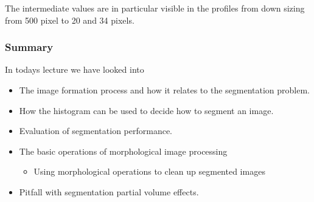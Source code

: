 \documentclass[letterpaper,10pt,english]{sphinxmanual}
\begin{document}
\begin{sphinxVerbatim}[commandchars=\\\{\}]
    \PYG{p}{[}\PYG{p}{[}\PYG{p}{]}\PYG{p}{]}  
\end{sphinxVerbatim}

\noindent{}

\sphinxAtStartPar
The intermediate values are in particular visible in the profiles from down sizing from 500 pixel to 20 and 34 pixels.


\subsubsection{Summary}
\label{\detokenize{04-BasicSegmentation_Part2:summary}}
\sphinxAtStartPar
In todays lecture we have looked into
\begin{itemize}
\item {} 
\sphinxAtStartPar
The image formation process and how it relates to the segmentation problem.

\item {} 
\sphinxAtStartPar
How the histogram can be used to decide how to segment an image.

\item {} 
\sphinxAtStartPar
Evaluation of segmentation performance.

\item {} 
\sphinxAtStartPar
The basic operations of morphological image processing
\begin{itemize}
\item {} 
\sphinxAtStartPar
Using morphological operations to clean up segmented images

\end{itemize}

\item {} 
\sphinxAtStartPar
Pitfall with segmentation \sphinxhyphen{} partial volume effects.

\end{itemize}







\renewcommand{\indexname}{Index}
\printindex
\end{document}

